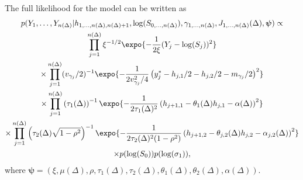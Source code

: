 The full likelihood for the model can be written as
\begin{multline*}
  p(Y_1, \ldots, Y_{n(\Delta)} | h_{1,\ldots,n(\Delta), n(\Delta)+1},
  \log( S_{0,\ldots,n(\Delta)} ), \gamma_{1,\ldots,n(\Delta)},
  J_{1,\ldots,n(\Delta)}(\Delta), \boldsymbol{\psi} ) \propto \\
  \prod_{j=1}^{n(\Delta)} \xi^{-1/2} \expo{ -\frac{1}{2\xi} (Y_j - \log(S_j))^2 } \\
 	\times \prod_{j=1}^{n(\Delta)} (v_{\gamma_j} / 2)^{-1} \expo{ -\frac{1}{2 v^2_{\gamma_j}/4 } \left( y^*_j - h_{j,1}/2 - h_{j,2}/2 - m_{\gamma_j}/2 \right)^2 } \\
   	\times \prod_{j=1}^{n(\Delta)} \left(\tau_1(\Delta)  \right)^{-1} \expo{ -\frac{1}{2 \tau_1(\Delta)^2  } \left( h_{j+1,1} - \theta_{1}(\Delta) h_{j,1} - \alpha(\Delta)  \right)^2 } \\
 	\times \prod_{j=1}^{n(\Delta)} \left(\tau_2(\Delta) \sqrt{1 - \rho^2} \right)^{-1} \expo{ -\frac{1}{2 \tau_2(\Delta)^2 (1-\rho^2) } \left( h_{j+1,2} - \theta_{j,2}(\Delta) h_{j,2} - \alpha_{j,2}(\Delta)  \right)^2 } \\
 	\times p(\log(S_0)) p(\log(\sigma_1)),
\end{multline*}
where $\boldsymbol{\psi} = (\xi, \mu(\Delta), \rho, \tau_1(\Delta), \tau_2(\Delta), \theta_1(\Delta), \theta_2(\Delta), \alpha(\Delta)).$

